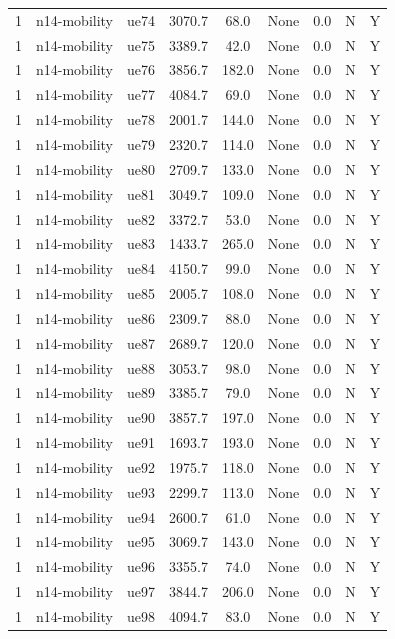 \begin{table}[ht]
\begin{tabular}{|c|c|c|c|c|c|c|c|c|}
1 & n14-mobility & ue74 & 3070.7 & 68.0 & None & 0.0 & N & Y \\
1 & n14-mobility & ue75 & 3389.7 & 42.0 & None & 0.0 & N & Y \\
1 & n14-mobility & ue76 & 3856.7 & 182.0 & None & 0.0 & N & Y \\
1 & n14-mobility & ue77 & 4084.7 & 69.0 & None & 0.0 & N & Y \\
1 & n14-mobility & ue78 & 2001.7 & 144.0 & None & 0.0 & N & Y \\
1 & n14-mobility & ue79 & 2320.7 & 114.0 & None & 0.0 & N & Y \\
1 & n14-mobility & ue80 & 2709.7 & 133.0 & None & 0.0 & N & Y \\
1 & n14-mobility & ue81 & 3049.7 & 109.0 & None & 0.0 & N & Y \\
1 & n14-mobility & ue82 & 3372.7 & 53.0 & None & 0.0 & N & Y \\
1 & n14-mobility & ue83 & 1433.7 & 265.0 & None & 0.0 & N & Y \\
1 & n14-mobility & ue84 & 4150.7 & 99.0 & None & 0.0 & N & Y \\
1 & n14-mobility & ue85 & 2005.7 & 108.0 & None & 0.0 & N & Y \\
1 & n14-mobility & ue86 & 2309.7 & 88.0 & None & 0.0 & N & Y \\
1 & n14-mobility & ue87 & 2689.7 & 120.0 & None & 0.0 & N & Y \\
1 & n14-mobility & ue88 & 3053.7 & 98.0 & None & 0.0 & N & Y \\
1 & n14-mobility & ue89 & 3385.7 & 79.0 & None & 0.0 & N & Y \\
1 & n14-mobility & ue90 & 3857.7 & 197.0 & None & 0.0 & N & Y \\
1 & n14-mobility & ue91 & 1693.7 & 193.0 & None & 0.0 & N & Y \\
1 & n14-mobility & ue92 & 1975.7 & 118.0 & None & 0.0 & N & Y \\
1 & n14-mobility & ue93 & 2299.7 & 113.0 & None & 0.0 & N & Y \\
1 & n14-mobility & ue94 & 2600.7 & 61.0 & None & 0.0 & N & Y \\
1 & n14-mobility & ue95 & 3069.7 & 143.0 & None & 0.0 & N & Y \\
1 & n14-mobility & ue96 & 3355.7 & 74.0 & None & 0.0 & N & Y \\
1 & n14-mobility & ue97 & 3844.7 & 206.0 & None & 0.0 & N & Y \\
1 & n14-mobility & ue98 & 4094.7 & 83.0 & None & 0.0 & N & Y \\

\end{tabular}
\end{table}
